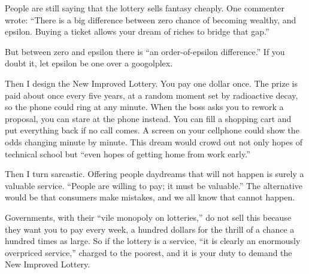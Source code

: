 
People are still saying that the lottery sells fantasy cheaply. One commenter wrote: ``There is a big difference between zero chance of becoming wealthy, and epsilon. Buying a ticket allows your dream of riches to bridge that gap.'' 

But between zero and epsilon there is ``an order-of-epsilon difference.'' If you doubt it, let epsilon be one over a googolplex. 

Then I design the New Improved Lottery. You pay one dollar once. The prize is paid about once every five years, at a random moment set by radioactive decay, so the phone could ring at any minute. When the boss asks you to rework a proposal, you can stare at the phone instead. You can fill a shopping cart and put everything back if no call comes. A screen on your cellphone could show the odds changing minute by minute. This dream would crowd out not only hopes of technical school but ``even hopes of getting home from work early.'' 

Then I turn sarcastic. Offering people daydreams that will not happen is surely a valuable service. ``People are willing to pay; it must be valuable.'' The alternative would be that consumers make mistakes, and we all know that cannot happen.

Governments, with their ``vile monopoly on lotteries,'' do not sell this because they want you to pay every week, a hundred dollars for the thrill of a chance a hundred times as large.  So if the lottery is a service, ``it is clearly an enormously overpriced service,'' charged to the poorest, and it is your duty to demand the New Improved Lottery. 
